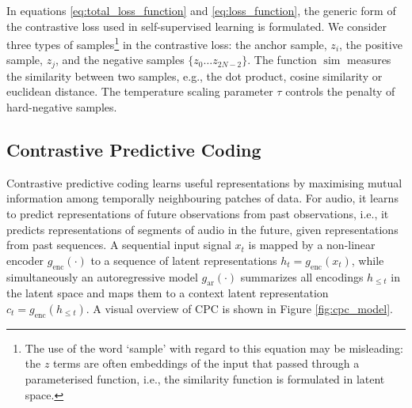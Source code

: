 In equations \ref{eq:total_loss_function} and \ref{eq:loss_function}, the generic form of the contrastive loss used in self-supervised learning is formulated.
We consider three types of samples\footnote{The use of the word `sample' with regard to this equation may be misleading: the $z$ terms are often embeddings of the input that passed through a parameterised function, i.e., the similarity function is formulated in latent space.} in the contrastive loss: the anchor sample, $z_i$, the positive sample, $z_j$, and the negative samples $\{ z_0 \dots z_{2N-2} \}$.
The function $\operatorname{sim}$ measures the similarity between two samples, e.g., the dot product, cosine similarity or euclidean distance.
The temperature scaling parameter $\tau$ controls the penalty of hard-negative samples.






\subsection{Contrastive Predictive Coding}\label{sec:cpc}
Contrastive predictive coding learns useful representations by maximising mutual information among temporally neighbouring patches of data.
For audio, it learns to predict representations of future observations from past observations, i.e., it predicts representations of segments of audio in the future, given representations from past sequences.
A sequential input signal $x_t$ is mapped by a non-linear encoder $g_{\mathrm{enc}}(\cdot)$ to a sequence of latent representations $h_t = g_{\mathrm{enc}}(x_t)$, while simultaneously an autoregressive model $g_{\mathrm{ar}}(\cdot)$ summarizes all encodings $h_{\leq t}$ in the latent space and maps them to a context latent representation $c_t = g_{\mathrm{enc}}(h_{\leq t})$. A visual overview of CPC is shown in Figure \ref{fig:cpc_model}.


